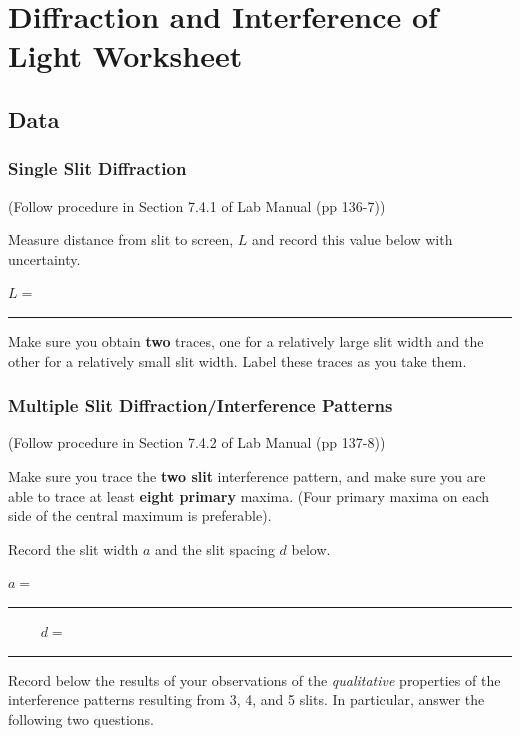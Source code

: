 \vfill
\pagebreak

\renewcommand{\thesection}{\thechapter.W}

\section{Diffraction and Interference of Light Worksheet}
\subsection{Data}

\subsubsection{Single Slit Diffraction}

(Follow procedure in Section 7.4.1 of Lab Manual (pp 136-7))
\vspace*{.5cm}

\noindent
Measure distance from slit to screen, $L$ and record this value below with uncertainty.

\begin{center}
$L=$~ \rule{3cm}{.1mm} 
\end{center}
\vspace*{.5cm}

\noindent
Make sure you obtain {\bf two} traces, one for a relatively large slit
width and the other for a relatively small slit width. Label these
traces as you take them.

\subsubsection{Multiple Slit Diffraction/Interference Patterns}

(Follow procedure in Section 7.4.2 of Lab Manual (pp 137-8))

\noindent
Make sure you trace the {\bf two slit} interference pattern, and make
sure you are able to trace at least {\bf eight primary} maxima. (Four
primary maxima on each side of the central maximum is preferable).

\noindent 
Record the slit width $a$ and the slit spacing $d$ below.

\begin{center}
$a=$~ \rule{3cm}{.1mm}~~~~ $d=$~ \rule{3cm}{.1mm}
\end{center}
\vspace*{.5cm}

\noindent
Record below the results of your observations of the {\it qualitative}
properties of the interference patterns resulting from 3, 4, and 5
slits. In particular, answer the following two questions.
\vspace*{.5cm}

